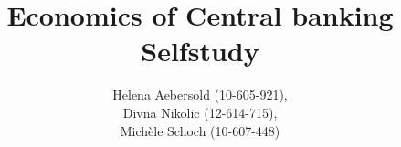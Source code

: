 \documentclass[11pt,a4paper]{report}
\begin{document}
	\title{\textbf{Economics of Central banking} \\ \vspace{40pt} Selfstudy}
	\author{Helena Aebersold (10-605-921), \\ Divna Nikolic (12-614-715), \\ Michèle Schoch (10-607-448)}
	\maketitle
	
	
	
	
\end{document}
